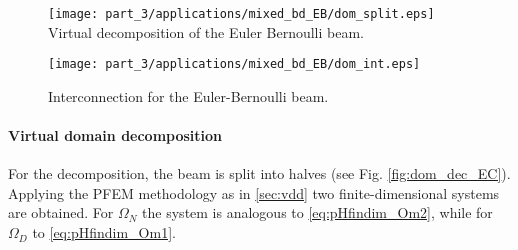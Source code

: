 \begin{figure}[t]
	\begin{minipage}[b]{0.4\linewidth}
		\centering
		\texttt{[image: part\_3/applications/mixed\_bd\_EB/dom\_split.eps]} \\
		\caption{Virtual decomposition of the Euler Bernoulli beam.}
		\label{fig:dom_dec_EC}
	\end{minipage}
	\hspace{0.5cm}
	\begin{minipage}[b]{0.5\linewidth}
		\centering
		\texttt{[image: part\_3/applications/mixed\_bd\_EB/dom\_int.eps]}
		\caption{Interconnection for the Euler-Bernoulli beam.}
		\label{fig:dom_int_EB}
	\end{minipage}
\end{figure}


\paragraph{Virtual domain decomposition}
For the decomposition, the beam is split into halves (see Fig. \ref{fig:dom_dec_EC}).
Applying the PFEM methodology as in \ref{sec:vdd} two finite-dimensional systems are obtained. For $\Omega_N$ the system is analogous to \eqref{eq:pHfindim_Om2}, while for $\Omega_D$ to \eqref{eq:pHfindim_Om1}.


